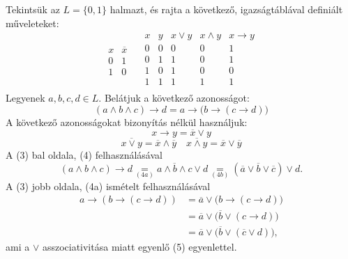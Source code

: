 \documentclass{article}
\begin{document}
    Tekintsük az $L = \{0, 1\}$ halmazt, és rajta a következő, igazságtáblával definiált műveleteket:
    \[
    \begin{array}{c||c}
        x & \overline{x} \\ \hline
        0 & 1 \\
        1 & 0
    \end{array}
    \quad
    \begin{array}{cc||c|c|c}
        x & y & x \vee y  & x \wedge y  & x \rightarrow y \\ \hline
        0 & 0 & 0 & 0 & 1 \\
        0 & 1 & 1 & 0 & 1 \\
        1 & 0 & 1 & 0 & 0 \\
        1 & 1 & 1 & 1 & 1 \\
    \end{array}
    \]
    Legyenek $a, b, c, d \in L.$ Belátjuk a következő azonosságot:
        \[ (a \wedge b \wedge c) \rightarrow d = a \rightarrow \bigl(b \rightarrow (c \rightarrow d)\bigr) \]
    A következő azonosságokat bizonyítás nélkül használjuk:
        \[x \rightarrow y = \overline{x} \vee y\]
        \[\overline{x \vee y} = \overline{x} \wedge \overline{y} 
          \quad
          \overline{x \wedge y} = \overline{x} \vee \overline{y}\]
    A (3) bal oldala, (4) felhasználásával
        \[ (a \wedge b \wedge c) \rightarrow d \underset{(4a)}{=} \overline{a \wedge b \wedge c} \vee d \underset{(4b)}{=} (\overline{a} \vee \overline{b} \vee \overline{c}) \vee d. \]
    A (3) jobb oldala, (4a) ismételt felhasználásával
    \begin{align*}
        a \rightarrow (b \rightarrow (c \rightarrow d)) &= \overline{a} \vee \bigl(b \rightarrow (c \rightarrow d)\bigr) \\
        &= \overline{a} \vee \bigl(\overline{b} \vee (c \rightarrow d)\bigr) \\
        &= \overline{a} \vee \bigl(\overline{b} \vee (\overline{c} \vee d)\bigr),
    \end{align*}
    ami a $\vee$ asszociativitása miatt egyenlő (5) egyenlettel.
\end{document}
